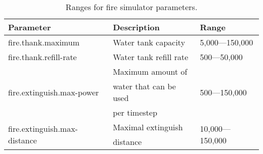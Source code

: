 \documentclass{article}
\begin{document}
\begin{table}[htb]
\caption{Ranges for fire simulator parameters.}
\label{tab:10}
\centering
\begin{tabular}{lll}
  \hline
  \textbf{Parameter}                            & \textbf{Description}    &
  \textbf{Range}\\
  \hline
  fire.thank.maximum                            & Water tank capacity     &
  5,000---150,000\\
  \hline
  fire.thank.refill-rate                        & Water tank refill rate  &
  500---50,000\\
  \hline
  \multirow{3}{*}{fire.extinguish.max-power}    & Maximum amount of       &
  \multirow{3}{*}{500---150,000}\\
                                                & water that can be used  & \\
                                                & per timestep            & \\
  \hline
  \multirow{2}{*}{fire.extinguish.max-distance} & Maximal extinguish      &
  \multirow{2}{*}{10,000---150,000}\\
                                                & distance                & \\
  \hline
\end{tabular}
\end{table}
\end{document}
